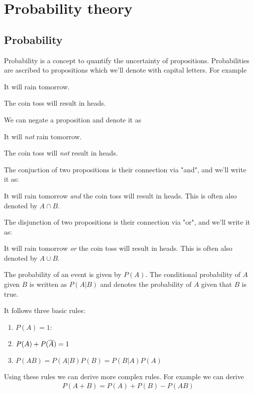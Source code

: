 \chapter{Probability theory}
\section{Probability}
Probability is a concept to quantify the uncertainty of propositions.
Probabilities are ascribed to propositions which we'll denote with capital letters.
For example\par
      It will rain tomorrow.\par
      The coin toss will result in heads.

We can negate a proposition and denote it as  \par
      It will \emph{not} rain tomorrow.\par
      The coin toss will \emph{not} result in heads.

  
The conjuction of two propositions is their connection via "and", and we'll write it as:
\par
{}  It will  rain tomorrow \emph{and} the coin toss will result in heads.
This is often also denoted by $A \cap B$.

The disjunction of two propositions is their connection via "or", and we'll write it as:
\par
{}  It will  rain tomorrow \emph{or} the coin toss will result in heads.
This is often also denoted by $A \cup B$.

The probability of an event is given by $P(A)$. 
The conditional probability of $A$ given $B$ is written as $P(A|B)$ and denotes 
the probability of $A$ given that $B$ is true.

It follows three basic rules:
\begin{enumerate}
  \item $P(A)=1$:   
  \item $P(A)+P(\overline{A}) = 1$ 
  \item $P(AB) = P(A|B)P(B) = P(B|A)P(A)$
\end{enumerate}

Using these rules we can derive more complex rules. For example we can 
derive 
\begin{align}
  P(A+B) = P(A) + P(B) - P(AB)
\end{align}

